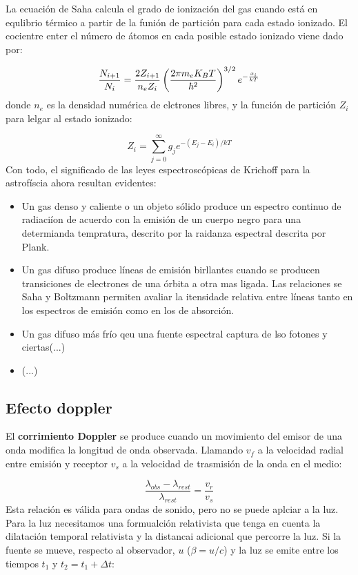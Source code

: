 La ecuación de Saha calcula el grado de ionización del gas cuando está en equlibrio térmico a partir de la funión de partición para cada estado ionizado. El cocientre enter el número de átomos en cada posible estado ionizado viene dado por:

\begin{equation}
	\frac{N_{i+1}}{N_i} = \frac{2Z_{i+1}}{n_eZ_i} \left( \frac{2\pi m_eK_B T}{\hbar^2} \right)^{3/2} e^{-\frac{x_i}{kT}}
\end{equation}
donde $n_e$ es la densidad numérica de elctrones libres, y la función de partición $Z_i$ para lelgar al estado ionizado:

\begin{equation}
	Z_i = \sum_{j=0}^\infty g_j e^{-(E_j-E_i)/kT}
\end{equation}
Con todo, el significado de las leyes espectroscópicas de Krichoff para la astrofíscia ahora resultan evidentes:

\begin{itemize}
	\item Un gas denso y caliente o un objeto sólido produce un espectro continuo de radiaciíon de acuerdo con la emisión de un cuerpo negro para una determianda tempratura, descrito por la raidanza espectral descrita por Plank.
	\item Un gas difuso produce líneas de emisión birllantes cuando se producen transiciones de electrones de una órbita a otra mas ligada. Las relaciones se Saha y Boltzmann permiten avaliar la itensidade relativa entre líneas tanto en los espectros de emisión como en los de absorción.
	\item Un gas difuso más frío qeu una fuente espectral captura de lso fotones y ciertas(...)
	\item (...)
\end{itemize}

\subsection{Efecto doppler}

El \textbf{corrimiento Doppler} se produce cuando un movimiento del emisor de una onda modifica la longitud de onda observada. Llamando $v_f$ a la velocidad radial entre emisión y receptor $v_s$ a la velocidad de trasmisión de la onda en el medio:

\begin{equation}
	\frac{\lambda_{obs}-\lambda_{rest}}{\lambda_{rest}} = \frac{v_r}{v_s}
\end{equation}
Esta relación es válida para ondas de sonido, pero no se puede aplciar a la luz. Para la luz necesitamos una formualción relativista que tenga en cuenta la dilatación temporal relativista y la distancai adicional que percorre la luz. Si la fuente se mueve, respecto al observador, $u$ ($\beta=u/c$) y la luz se emite entre los tiempos $t_1$ y $t_2=t_1+\Delta t$:

